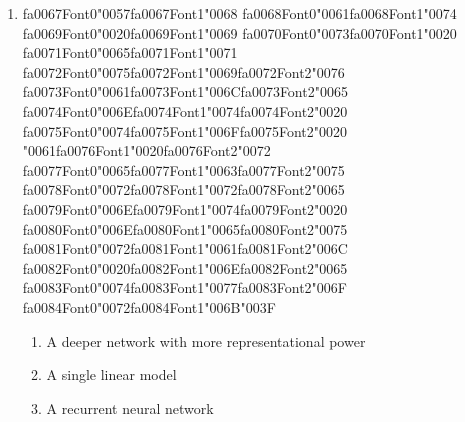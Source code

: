 \documentclass[12pt]{article}
\begin{document}
\begin{enumerate}[label=Q\arabic*.]
\begin{enumerate}[label=(\Alph*)]
    \item They are reused across timestamps
    \item They increase in value as the sequence progresses
    \item Only the output weight V is reused
\end{enumerate}
\item {\csname fa0067Font0\endcsname\char"0057}{\csname fa0067Font1\endcsname\char"0068} {\csname fa0068Font0\endcsname\char"0061}{\csname fa0068Font1\endcsname\char"0074} {\csname fa0069Font0\endcsname\char"0020}{\csname fa0069Font1\endcsname\char"0069} {\csname fa0070Font0\endcsname\char"0073}{\csname fa0070Font1\endcsname\char"0020} {\csname fa0071Font0\endcsname\char"0065}{\csname fa0071Font1\endcsname\char"0071} {\csname fa0072Font0\endcsname\char"0075}{\csname fa0072Font1\endcsname\char"0069}{\csname fa0072Font2\endcsname\char"0076} {\csname fa0073Font0\endcsname\char"0061}{\csname fa0073Font1\endcsname\char"006C}{\csname fa0073Font2\endcsname\char"0065} {\csname fa0074Font0\endcsname\char"006E}{\csname fa0074Font1\endcsname\char"0074}{\csname fa0074Font2\endcsname\char"0020} {\csname fa0075Font0\endcsname\char"0074}{\csname fa0075Font1\endcsname\char"006F}{\csname fa0075Font2\endcsname\char"0020} {\char"0061}{\csname fa0076Font1\endcsname\char"0020}{\csname fa0076Font2\endcsname\char"0072} {\csname fa0077Font0\endcsname\char"0065}{\csname fa0077Font1\endcsname\char"0063}{\csname fa0077Font2\endcsname\char"0075} {\csname fa0078Font0\endcsname\char"0072}{\csname fa0078Font1\endcsname\char"0072}{\csname fa0078Font2\endcsname\char"0065} {\csname fa0079Font0\endcsname\char"006E}{\csname fa0079Font1\endcsname\char"0074}{\csname fa0079Font2\endcsname\char"0020} {\csname fa0080Font0\endcsname\char"006E}{\csname fa0080Font1\endcsname\char"0065}{\csname fa0080Font2\endcsname\char"0075} {\csname fa0081Font0\endcsname\char"0072}{\csname fa0081Font1\endcsname\char"0061}{\csname fa0081Font2\endcsname\char"006C} {\csname fa0082Font0\endcsname\char"0020}{\csname fa0082Font1\endcsname\char"006E}{\csname fa0082Font2\endcsname\char"0065} {\csname fa0083Font0\endcsname\char"0074}{\csname fa0083Font1\endcsname\char"0077}{\csname fa0083Font2\endcsname\char"006F} {\csname fa0084Font0\endcsname\char"0072}{\csname fa0084Font1\endcsname\char"006B}{\char"003F}
\begin{enumerate}[label=(\Alph*)]
    \item A deeper network with more representational power
    \item A single linear model
    \item A recurrent neural network

\end{enumerate}
\end{enumerate}
\end{document}
